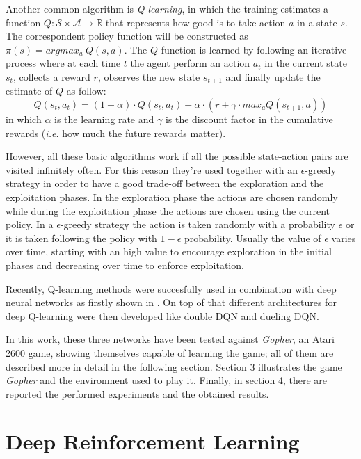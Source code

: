 \documentclass[article,11pt]{article}
\begin{document}
	Another common algorithm is \textit{Q-learning}, in which the training estimates a function $Q: \mathcal{S}\times\mathcal{A}\to\mathbb{R}$ that represents how good is to take action $a$ in a state $s$. The correspondent policy function will be constructed as $\pi(s) = argmax_{a}\ Q(s, a)$. The $Q$ function is learned by following an iterative process where at each time $t$ the agent perform an action $a_t$ in the current state $s_t$, collects a reward $r$, observes the new state $s_{t+1}$ and finally update the estimate of $Q$ as follow:
	\begin{equation}
		\label{eq:qlearning}
		Q(s_t, a_t) = (1-\alpha)\cdot Q(s_t, a_t) + \alpha \cdot (r + \gamma\cdot max_aQ(s_{t+1}, a))
	\end{equation}
	in which $\alpha$ is the learning rate and $\gamma$ is the discount factor in the cumulative rewards (\textit{i.e.} how much the future rewards matter).
	
	However, all these basic algorithms work if all the possible state-action pairs are visited infinitely often. For this reason they're used together with an $\epsilon$-greedy strategy in order to have a good trade-off between the exploration and the exploitation phases. In the exploration phase the actions are chosen randomly while during the exploitation phase the actions are chosen using the current policy. In a $\epsilon$-greedy strategy the action is taken randomly with a probability $\epsilon$ or it is taken following the policy with $1-\epsilon$ probability. Usually the value of $\epsilon$ varies over time, starting with an high value to encourage exploration in the initial phases and decreasing over time to enforce exploitation.
	
	Recently, Q-learning methods were succesfully used in combination with deep neural networks as firstly shown in \cite{dqn2013}. On top of that different architectures for deep Q-learning were then developed like double DQN\cite{doubledqn} and dueling DQN\cite{duelingdqn}.
	
	In this work, these three networks have been tested against \textit{Gopher}, an Atari 2600 game, showing themselves capable of learning the game; all of them are described more in detail in the following section. 
	Section 3 illustrates the game \textit{Gopher} and the environment used to play it. Finally, in section 4, there are reported the  performed experiments and the obtained results.
	
	\section{Deep Reinforcement Learning}
	
\end{document}
